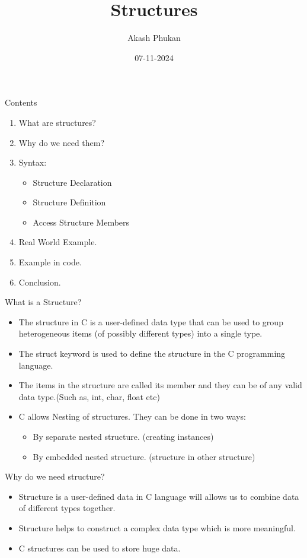 \documentclass[13pt]{beamer}
\title{Structures}
\author{Akash Phukan}
\institute{Roll No: 05, MCA 1st SEM}
\date{07-11-2024}
\begin{document}
\maketitle

\begin{frame}{Contents}
\begin{enumerate}
    \item What are structures?
    \item Why do we need them?
    \item Syntax:
    \begin{itemize}
        \item Structure Declaration
        \item Structure Definition
        \item Access Structure Members
    \end{itemize}
    \item Real World Example.
    \item Example in code.
    \item Conclusion.
\end{enumerate}
\end{frame}

\begin{frame}{What is a Structure?}
\begin{itemize}
    \item The structure in C is a user-defined data type that can be used to group heterogeneous items (of possibly different types) into a single type. 
    
    \item The struct keyword is used to define the structure in the C programming language.  
    
    \item The items in the structure are called its member and they can be of any valid data type.(Such as, int, char, float etc)

    \item C allows Nesting of structures. They can be done in two ways:
    \begin{itemize}
        \item By separate nested structure. (creating instances)
        \item By embedded nested structure. (structure in other structure)
    \end{itemize}
\end{itemize}
\end{frame}

\begin{frame}{Why do we need structure?}
\begin{itemize}
    \item Structure is a user-defined data in C language will allows us to combine data of different types together. 
    \item Structure helps to construct a complex data type which is more meaningful.
    \item C structures can be used to store huge data.
\end{itemize}
\end{frame}
\end{document}
